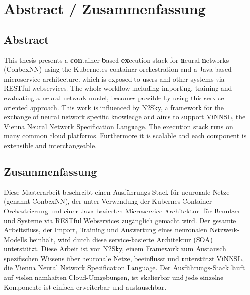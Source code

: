 \hypertarget{abstract-zusammenfassung}{%
\chapter*{Abstract / Zusammenfassung}\label{abstract-zusammenfassung}}

\hypertarget{abstract}{%
\section*{Abstract}\label{abstract}}

This thesis presents a \textbf{con}tainer \textbf{b}ased
\textbf{ex}ecution stack for \textbf{n}eural \textbf{n}etworks
(ConbexNN) using the
Kubernetes container orchestration and a Java based microservice
architecture, which is exposed to users and other systems via RESTful
webservices. The whole workflow including importing, training and
evaluating a neural network model, becomes possible by using this
service oriented approach. This work is influenced by N2Sky, a framework
for the exchange of neural network specific knowledge and aims to
support ViNNSL, the Vienna Neural Network Specification Language. The
 execution stack runs on many common cloud platforms.
Furthermore it is scalable and each component is extensible and
interchangeable.

\hypertarget{zusammenfassung}{%
\section*{Zusammenfassung}\label{zusammenfassung}}

Diese Masterarbeit beschreibt einen Ausführungs-Stack für neuronale
Netze (genannt ConbexNN), der unter Verwendung der Kubernes Container-Orchestrierung und
einer Java basierten Microservice-Architektur, für Benutzer und Systeme
via RESTful Webservices zugänglich gemacht wird. Der gesamte
Arbeitsfluss, der Import, Training und Auswertung eines neuronalen
Netzwerk-Modells beinhält, wird durch diese service-basierte Architektur
(SOA) unterstützt. Diese Arbeit ist von N2Sky, einem Framework zum Austausch spezifischen Wissens über neuronale Netze, beeinflusst und unterstützt ViNNSL, die Vienna Neural Network Specification Language. Der Ausführungs-Stack läuft auf vielen namhaften
Cloud-Umgebungen, ist skalierbar und jede einzelne Komponente ist
einfach erweiterbar und austauschbar.

